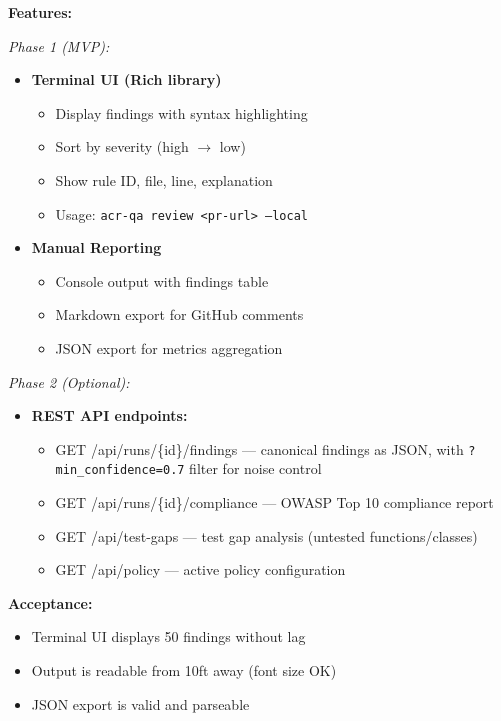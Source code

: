 \documentclass[11pt,a4paper]{article}
\begin{document}
\textbf{Features:}

\textit{Phase 1 (MVP):}
\begin{itemize}[leftmargin=*]
    \item \textbf{Terminal UI (Rich library)}
    \begin{itemize}
        \item Display findings with syntax highlighting
        \item Sort by severity (high $\rightarrow$ low)
        \item Show rule ID, file, line, explanation
        \item Usage: \texttt{acr-qa review <pr-url> --local}
    \end{itemize}

    \item \textbf{Manual Reporting}
    \begin{itemize}
        \item Console output with findings table
        \item Markdown export for GitHub comments
        \item JSON export for metrics aggregation
    \end{itemize}
\end{itemize}

\textit{Phase 2 (Optional):}
\begin{itemize}[leftmargin=*]
    \item \textbf{REST API endpoints:}
    \begin{itemize}
        \item GET /api/runs/\{id\}/findings --- canonical findings as JSON, with \texttt{?min\_confidence=0.7} filter for noise control
        \item GET /api/runs/\{id\}/compliance --- OWASP Top 10 compliance report
        \item GET /api/test-gaps --- test gap analysis (untested functions/classes)
        \item GET /api/policy --- active policy configuration
    \end{itemize}
\end{itemize}

\textbf{Acceptance:}
\begin{itemize}[leftmargin=*]
    \item[$\checkmark$] Terminal UI displays 50 findings without lag
    \item[$\checkmark$] Output is readable from 10ft away (font size OK)
    \item[$\checkmark$] JSON export is valid and parseable
\end{itemize}
\end{document}
